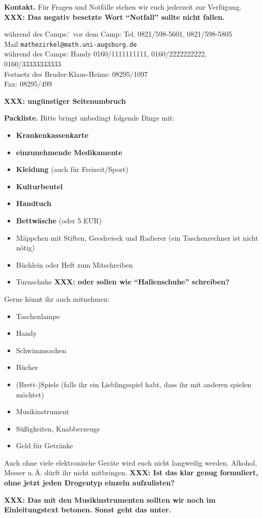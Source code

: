 \documentclass[12pt]{zettel}
\begin{document}
\begin{shaded}
\textbf{Kontakt.} Für Fragen und Notfälle stehen wir euch jederzeit zur
Verfügung. \textbf{XXX: Das negativ besetzte Wort "`Notfall"' sollte nicht
fallen.}
\begin{tabbing}
  während des Camps: \= \kill
  vor dem Camp: \> Tel. 0821/598-5601, 0821/598-5805 \\
  \> Mail \texttt{mathezirkel@math.uni-augsburg.de} \\
  während des Camps: \> Handy 0160/1111111111, 0160/2222222222, 0160/33333333333 \\
  \> Festnetz des Bruder-Klaus-Heims: 08295/1097 \\
  \> Fax: 08295/499
\end{tabbing}
\end{shaded}

\textbf{XXX: ungünstiger Seitenumbruch}

\begin{shaded}
\textbf{Packliste.} Bitte bringt unbedingt folgende Dinge mit:
\begin{multicols}{2}
\begin{itemize}
\item \textbf{Krankenkassenkarte}
\item \textbf{einzunehmende Medikamente}
\item \textbf{Kleidung} (auch für Freizeit/Sport)
\item \textbf{Kulturbeutel}
\item \textbf{Handtuch}
\item \textbf{Bettwäsche} (oder 5 EUR)
\item Mäppchen mit Stiften, Geodreieck und Radierer (ein Taschenrechner ist
nicht nötig)
\item Büchlein oder Heft zum Mitschreiben
\item Turnschuhe \textbf{XXX: oder sollen wie "`Hallenschuhe"' schreiben?}
\end{itemize}
\end{multicols}
Gerne könnt ihr auch mitnehmen:
\begin{multicols}{2}
\begin{itemize}
\item Taschenlampe
\item Handy
\item Schwimmsachen
\item Bücher
\item (Brett-)Spiele (falls ihr ein Lieblingsspiel habt, dass ihr mit anderen
spielen möchtet)
\item Musikinstrument
\item Süßigkeiten, Knabberzeugs
\item Geld für Getränke
\end{itemize}
\end{multicols}
Auch ohne viele elektronische Geräte wird euch nicht langweilig werden.
Alkohol, Messer u.\,Ä. dürft ihr nicht mitbringen. \textbf{XXX: Ist das klar
genug formuliert, ohne jetzt jeden Drogentyp einzeln aufzulisten?}
\end{shaded}

\textbf{XXX: Das mit den Musikinstrumenten sollten wir noch im Einleitungstext
betonen. Sonst geht das unter.}
\end{document}

